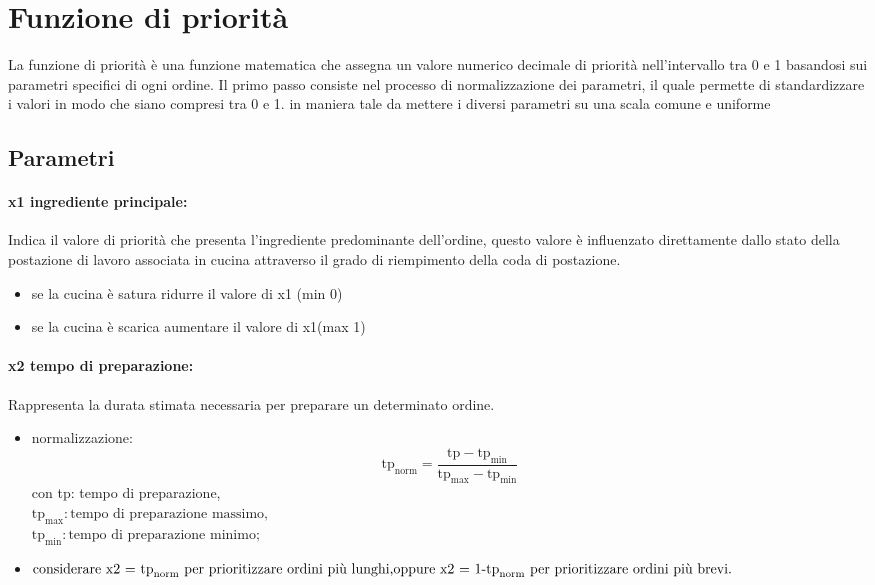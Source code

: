 \section{Funzione di priorità}
La funzione di priorità è una funzione matematica che assegna un valore numerico decimale di priorità nell’intervallo tra 0 e 1 basandosi sui parametri specifici di ogni ordine.
Il primo passo consiste nel processo di normalizzazione dei parametri, il quale permette di standardizzare i valori in modo che siano compresi tra 0 e 1. in maniera tale da mettere i diversi parametri su una scala comune e uniforme

\subsection{Parametri}

\paragraph{x1 ingrediente principale:}
Indica il valore di priorità che presenta l'ingrediente predominante dell’ordine, questo valore è influenzato direttamente dallo stato della postazione di lavoro associata in cucina attraverso il grado di riempimento della coda di postazione.
\begin{itemize}
	\item se la cucina è satura ridurre il valore di x1 (min 0)
	\item se la cucina è scarica aumentare il valore di x1(max 1)
\end{itemize}

\paragraph{x2 tempo di preparazione:}
Rappresenta la durata stimata necessaria per preparare un determinato ordine.
\begin{itemize}
	\item normalizzazione: \begin{equation*}
		\text{tp}_{\text{norm}} = \frac{\text{tp} - \text{tp}_{\text{min}}}{\text{tp}_{\text{max}} - \text{tp}_{\text{min}}}
	\end{equation*} con tp: tempo di preparazione,\\
	$\text{tp}_{\text{max}}: \text{tempo di preparazione massimo,}$\\
	$\text{tp}_{\text{min}}: \text{tempo di preparazione minimo;}$
	\item $\text{considerare x2 = tp}_{\text{norm}} \text{ per prioritizzare ordini più lunghi,}\\ \text{oppure x2 = 1-tp}_{\text{norm}} \text{ per prioritizzare ordini più brevi.}$
\end{itemize}


